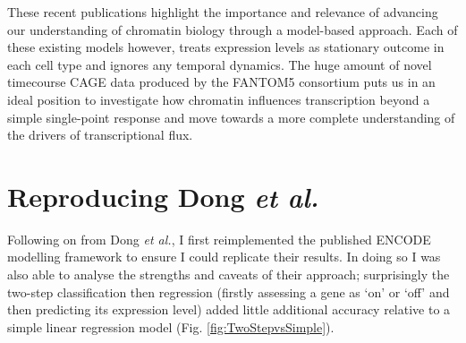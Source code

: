 \documentclass[a4paper,11pt,oneside]{book}
\begin{document}
These recent publications highlight the importance and relevance of
advancing our understanding of chromatin biology through a model-based
approach. Each of these existing models however, treats expression
levels as stationary outcome in each cell type and ignores any temporal
dynamics. The huge amount of novel timecourse CAGE data 
produced by the FANTOM5 consortium\cite{fantom5} puts us in an ideal
position to investigate how chromatin influences transcription beyond a
simple single-point response and move towards a more complete
understanding of the drivers of transcriptional flux.



\section{Reproducing Dong \emph{et al.} }

Following on from Dong \emph{et al.},\cite{Dong2012} I first
reimplemented the published ENCODE modelling framework to ensure I could
replicate their results. In doing so I was also able to analyse the
strengths and caveats of their approach; surprisingly the two-step classification
then regression (firstly assessing a gene as `on' or `off' and then
predicting its expression level) added little additional accuracy relative to a simple
linear regression model 
(Fig. \ref{fig:TwoStepvsSimple}). \\
\end{document}
